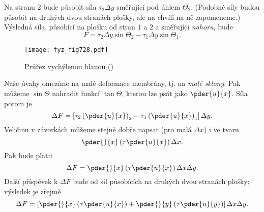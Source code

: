     Na stranu 2 bude působit síla \(\tau_2\Delta y\)  směřující pod úhlem \(\Theta_2\). (Podobné
    síly budou působit na druhých dvou stranách plošky, ale na chvíli na ně zapomeneme.) Výsledná
    síla, působící na plošku od stran \(1\) a \(2\) a směřující \emph{nahoru}, bude
    \begin{equation*}
      F = \tau_2\Delta y \sin\Theta_2 - \tau_1\Delta y \sin\Theta_1.
    \end{equation*}

    \begin{figure}[ht!] %
      \centering
      \texttt{[image: fyz\_fig728.pdf]}
      \caption{Průřez vychýlenou blanou (\cite[s.~707]{Feynman02})}
      \label{fyz:fig728}
    \end{figure}

    Naše úvahy omezíme na malé deformace membrány, tj. na \emph{malé sklony}. Pak můžeme
    \(\sin\Theta\) nahradit funkcí \(\tan\Theta\), kterou lze psát jako \(\pder{u}{x}\). Síla
    potom je
    \begin{equation*}
      \Delta F = \left[
          \tau_2\left(\pder{u}{x}\right)_2 - 
          \tau_1\left(\pder{u}{x}\right)_1
        \right]\Delta y.
    \end{equation*}
    Veličinu v závorkách můžeme stejně dobře napsat (pro malá \(\Delta x\)) i ve tvaru
    \begin{equation*}
      \pder{}{x}\left(\tau\pder{u}{x}\right)\Delta x.
    \end{equation*}
    Pak bude platit
    \begin{equation*}
      \Delta F = \pder{}{x}\left(\tau\pder{u}{x}\right)\Delta x\Delta y.
    \end{equation*}
    Další příspěvek k \(\Delta F\) bude od sil působících na druhých dvou stranách plošky; výsledek
    je zřejmě
    \begin{equation}\label{fyz:eq772}
      \Delta F = \left[
          \pder{}{x}\left(\tau\pder{u}{x}\right) + 
          \pder{}{y}\left(\tau\pder{u}{y}\right)
        \right]\Delta x\Delta y.
    \end{equation}

